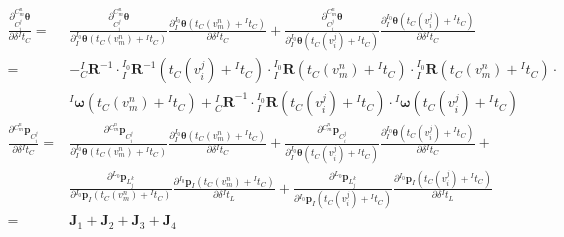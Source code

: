 \begin{equation}
  \begin{aligned}
    \frac{\partial ^{C_m^n}_{C_i^j}\boldsymbol{\theta}}{\partial \delta{^{I}t_{C}}}= &
    \frac{\partial ^{C_m^n}_{C_i^j}\boldsymbol{\theta}}{\partial {{^{I_0}_{I}}\boldsymbol{\theta}\left( t_{C}(v_m^n)+{^{I}t_C}\right) }}
    \frac{\partial {{^{I_0}_{I}}\boldsymbol{\theta}\left( t_{C}(v_m^n)+{^{I}t_C}\right) }}{\partial \delta {^{I}t_{C}}}
    +
    \frac{\partial ^{C_m^n}_{C_i^j}\boldsymbol{\theta}}{\partial {{^{I_0}_{I}}\boldsymbol{\theta}\left( t_{C}(v_i^j)+{^{I}t_C}\right) }}
    \frac{\partial {{^{I_0}_{I}}\boldsymbol{\theta}\left( t_{C}(v_i^j)+{^{I}t_C}\right) }}{\partial \delta {^{I}t_{C}}}
    \\
    =                                                                                & -{{^{I}_{C}}\boldsymbol{R}^{-1}}\cdot{{^{I_0}_{I}}\boldsymbol{R}^{-1}\left( t_{C}(v_i^j)+{^{I}t_C}\right) }
    \cdot{{^{I_0}_{I}}\boldsymbol{R}\left( t_{C}(v_m^n)+{^{I}t_C}\right) }
    \cdot{{^{I_0}_{I}}\boldsymbol{R}\left( t_{C}(v_m^n)+{^{I}t_C}\right) }
    \cdot\\&{^{I}\boldsymbol{\omega}}\left( t_{C}(v_m^n)+{^{I}t_C}\right)
    +{{^{I}_{C}}\boldsymbol{R}}^{-1}
    \cdot{{^{I_0}_{I}}\boldsymbol{R}\left( t_{C}(v_i^j)+{^{I}t_C}\right) }
    \cdot{^{I}\boldsymbol{\omega}}\left( t_{C}(v_i^j)+{^{I}t_C}\right)
    \\
    \frac{\partial {^{C_m^n}\boldsymbol{p}_{C_i^j}}}{\partial \delta {^{I}t_{C}}}=   &
    \frac{\partial {^{C_m^n}\boldsymbol{p}_{C_i^j}}}{\partial {{^{I_0}_{I}}\boldsymbol{\theta}\left( t_{C}(v_m^n)+{^{I}t_C}\right) }}
    \frac{\partial {{^{I_0}_{I}}\boldsymbol{\theta}\left( t_{C}(v_m^n)+{^{I}t_C}\right) }}{\partial \delta {^{I}t_{C}}}
    +
    \frac{\partial {^{C_m^n}\boldsymbol{p}_{C_i^j}}}{\partial {{^{I_0}_{I}}\boldsymbol{\theta}\left( t_{C}(v_i^j)+{^{I}t_C}\right) }}
    \frac{\partial {{^{I_0}_{I}}\boldsymbol{\theta}\left( t_{C}(v_i^j)+{^{I}t_C}\right) }}{\partial \delta {^{I}t_{C}}}
    +\\&
    \frac{\partial {^{L_0}\boldsymbol{p}_{L_j^k}}}{\partial {{^{I_0}}\boldsymbol{p}_{I}\left( t_{C}(v_m^n)+{^{I}t_C}\right) }}
    \frac{\partial {{^{I_0}}\boldsymbol{p}_{I}\left( t_{C}(v_m^n)+{^{I}t_C}\right) }}{\partial \delta {^{I}t_{L}}}
    +
    \frac{\partial {^{L_0}\boldsymbol{p}_{L_j^k}}}{\partial {{^{I_0}}\boldsymbol{p}_{I}\left( t_{C}(v_i^j)+{^{I}t_C}\right) }}
    \frac{\partial {{^{I_0}}\boldsymbol{p}_{I}\left( t_{C}(v_i^j)+{^{I}t_C}\right) }}{\partial \delta {^{I}t_{L}}}
    \\
    =                                                                                & \boldsymbol{J}_1+\boldsymbol{J}_2+\boldsymbol{J}_3+\boldsymbol{J}_4
  \end{aligned}
\end{equation}

